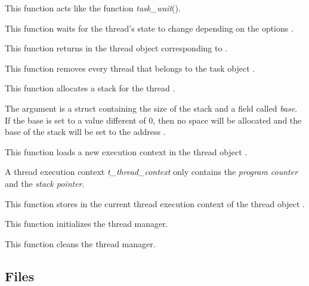 	 {
	   This function acts like the function \emph{task\_wait}().

	   This function waits for the thread's state to change depending on
	   the options .

	 }

	 {
	   This function returns in  the thread object
	   corresponding to .
	 }

	 {
	   This function removes every thread that belongs to the
	   task object .
	 }

	 {
	   This function allocates a stack for the thread .

	   The  argument is a struct containing the
	   size of the stack and a field called \emph{base}. If the
	   base is set to a value different of 0, then no space will
	   be allocated and the base of the stack will be set to the
	   address .
	 }

	 {
	   This function loads a new execution context in the thread
	   object .

	   A thread execution context \textit{t\_thread\_context}
	   only contains the \textit{program counter} and the
	   \textit{stack pointer}.
	 }

	 {
	   This function stores in  the current
	   thread execution context of the thread object .
	 }

	 {
	   This function initializes the thread manager.
	 }

	 {
	   This function cleans the thread manager.
	 }

\newpage

\subsection*{Files}

